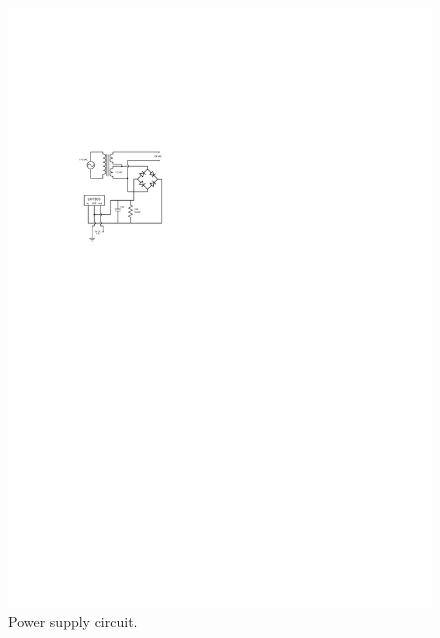 \documentclass{article}
\begin{document}
\begin{figure}[hbp]
\centering
\includegraphics[scale=2.0]{figs/power}
\caption{Power supply circuit.}\label{fig:power}
\end{figure}


\pagebreak
\printbibliography
\end{document}
